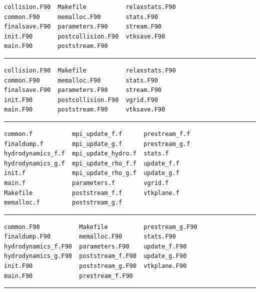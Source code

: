 \documentclass[12pt]{report}
\begin{document}
\begin{verbatim}
collision.F90  Makefile           relaxstats.F90
common.F90     memalloc.F90       stats.F90
finalsave.F90  parameters.F90     stream.F90
init.F90       postcollision.F90  vtksave.F90
main.F90       poststream.F90
\end{verbatim}
\hrule\vspace{1em}

\vspace{-1em}

\begin{verbatim}
collision.F90  Makefile           relaxstats.F90
common.F90     memalloc.F90       stats.F90
finalsave.F90  parameters.F90     stream.F90
init.F90       postcollision.F90  vgrid.F90
main.F90       poststream.F90     vtksave.F90
\end{verbatim}
\hrule\vspace{1em}

\vspace{-1em}

\begin{verbatim}
common.f           mpi_update_f.f      prestream_f.f
finaldump.f        mpi_update_g.f      prestream_g.f
hydrodynamics_f.f  mpi_update_hydro.f  stats.f
hydrodynamics_g.f  mpi_update_rho_f.f  update_f.f
init.f             mpi_update_rho_g.f  update_g.f
main.f             parameters.f        vgrid.f
Makefile           poststream_f.f      vtkplane.f
memalloc.f         poststream_g.f
\end{verbatim}
\hrule\vspace{1em}


\begin{verbatim}
common.F90           Makefile          prestream_g.F90
finaldump.F90        memalloc.F90      stats.F90
hydrodynamics_f.F90  parameters.F90    update_f.F90
hydrodynamics_g.F90  poststream_f.F90  update_g.F90
init.F90             poststream_g.F90  vtkplane.F90
main.F90             prestream_f.F90
\end{verbatim}
\hrule\vspace{1em}
\end{document}
